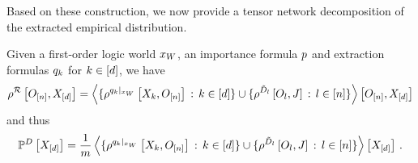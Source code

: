 Based on these construction, we now provide a tensor network decomposition of the extracted empirical distribution.

\begin{theorem}
    Given a first-order logic world $x_{W}$, an importance formula $p$ and extraction formulas $q_{k}$ for $k\in[d]$, we have
    \begin{align*}
        \rho^{\mathcal{R}}\left[O_{[n]},X_{[d]}\right] =
        \left\langle 
            \{\rho^{{q_{k}}|_{x_{W}}}\left[X_{k},O_{[n]}\right] \, : \, k\in[d]\}
            \cup \{\rho^{\tilde{D}_{l}}\left[O_{l},J\right] \, : \, l\in[n]\}
        \right\rangle \left[ O_{[n]},X_{[d]} \right]
    \end{align*}
    and thus
    \begin{align*}
        \mathbb{P}^{D}\left[X_{[d]}\right] =
        \frac{1}{m}  \left\langle 
            \{\rho^{{q_{k}}|_{x_{W}}}\left[X_{k},O_{[n]}\right] \, : \, k\in[d]\}
            \cup \{\rho^{\tilde{D}_{l}}\left[O_{l},J\right] \, : \, l\in[n]\}
        \right\rangle \left[ X_{[d]} \right] \, .
    \end{align*}
\end{theorem}
